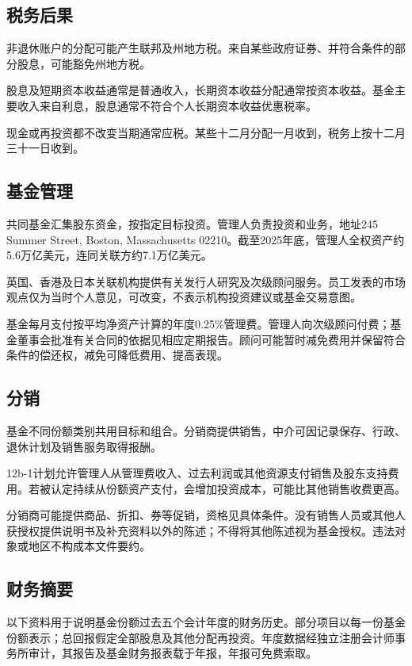 \documentclass[UTF8,fontset=none,11pt,a4paper]{ctexart}
\begin{document}
\subsection*{税务后果}
非退休账户的分配可能产生联邦及州地方税。来自某些政府证券、并符合条件的部分股息，可能豁免州地方税。


股息及短期资本收益通常是普通收入，长期资本收益分配通常按资本收益。基金主要收入来自利息，股息通常不符合个人长期资本收益优惠税率。


现金或再投资都不改变当期通常应税。某些十二月分配一月收到，税务上按十二月三十一日收到。


\subsection*{基金管理}
共同基金汇集股东资金，按指定目标投资。管理人负责投资和业务，地址245 Summer Street, Boston, Massachusetts 02210。截至2025年底，管理人全权资产约5.6万亿美元，连同关联方约7.1万亿美元。


英国、香港及日本关联机构提供有关发行人研究及次级顾问服务。员工发表的市场观点仅为当时个人意见，可改变，不表示机构投资建议或基金交易意图。


基金每月支付按平均净资产计算的年度0.25\%管理费。管理人向次级顾问付费；基金董事会批准有关合同的依据见相应定期报告。顾问可能暂时减免费用并保留符合条件的偿还权，减免可降低费用、提高表现。


\subsection*{分销}
基金不同份额类别共用目标和组合。分销商提供销售，中介可因记录保存、行政、退休计划及销售服务取得报酬。


12b-1计划允许管理人从管理费收入、过去利润或其他资源支付销售及股东支持费用。若被认定持续从份额资产支付，会增加投资成本，可能比其他销售收费更高。


分销商可能提供商品、折扣、券等促销，资格见具体条件。没有销售人员或其他人获授权提供说明书及补充资料以外的陈述；不得将其他陈述视为基金授权。违法对象或地区不构成本文件要约。


\subsection*{财务摘要}
以下资料用于说明基金份额过去五个会计年度的财务历史。部分项目以每一份基金份额表示；总回报假定全部股息及其他分配再投资。年度数据经独立注册会计师事务所审计，其报告及基金财务报表载于年报，年报可免费索取。
\end{document}

